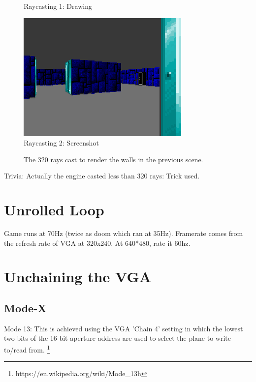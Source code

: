 \documentclass[book.tex]{subfiles}
\begin{document}
\begin{figure}[H]
  \centering
  
 \caption{Raycasting 1: Drawing} \label{fig:Raycasting1}
\end{figure}




\begin{figure}[H]
  \centering
 \includegraphics[scale=1.3]{imgs/ray_caster_explained/out_door.png}
 \caption{Raycasting 2: Screenshot} \label{fig:Raycasting2Drawing}
\end{figure}

\begin{figure}[H]
\centering
 
 \caption{The 320 rays cast to render the walls in the previous scene.} \label{fig:Raycasting2}
\end{figure}
 
Trivia: Actually the engine casted less than 320 rays: Trick used.
 

\section{Unrolled Loop}
Game runs at 70Hz (twice as doom which ran at 35Hz). Framerate comes from the refresh rate of VGA at 320x240. At 640*480, rate it 60hz.




\section{Unchaining the VGA}
\subsection{Mode-X}
Mode 13: This is achieved using the VGA 'Chain 4' setting in which the lowest two bits of the 16 bit aperture address are used to select the plane to write to/read from. \footnote{https://en.wikipedia.org/wiki/Mode\_13h}
\end{document}

